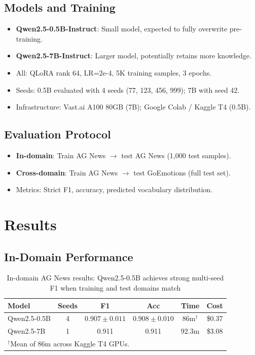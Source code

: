 \documentclass[journal]{IEEEtran}
\begin{document}
\subsection{Models and Training}
\begin{itemize}
\item \textbf{Qwen2.5-0.5B-Instruct}: Small model, expected to fully overwrite pre-training.
\item \textbf{Qwen2.5-7B-Instruct}: Larger model, potentially retains more knowledge.
\item All: QLoRA rank 64, LR=2e-4, 5K training samples, 3 epochs.
\item Seeds: 0.5B evaluated with 4 seeds (77, 123, 456, 999); 7B with seed 42.
\item Infrastructure: Vast.ai A100 80GB (7B); Google Colab / Kaggle T4 (0.5B).
\end{itemize}

\subsection{Evaluation Protocol}
\begin{itemize}
\item \textbf{In-domain}: Train AG News $\to$ test AG News (1,000 test samples).
\item \textbf{Cross-domain}: Train AG News $\to$ test GoEmotions (full test set).
\item Metrics: Strict F1, accuracy, predicted vocabulary distribution.
\end{itemize}

\section{Results}

\subsection{In-Domain Performance}

\begin{table}[!ht]
\centering
\caption{In-domain AG News results: Qwen2.5-0.5B achieves strong multi-seed F1 when training and test domains match}
\label{tab:indomain}
\begin{tabular}{lccccc}
\toprule
\textbf{Model} & \textbf{Seeds} & \textbf{F1} & \textbf{Acc} & \textbf{Time} & \textbf{Cost} \\
\midrule
Qwen2.5-0.5B & 4 & $0.907{\pm}0.011$ & $0.908{\pm}0.010$ & 86m$^\dagger$ & \$0.37 \\
Qwen2.5-7B & 1 & 0.911 & 0.911 & 92.3m & \$3.08 \\
\bottomrule
\multicolumn{6}{l}{\scriptsize $^\dagger$Mean of 86m across Kaggle T4 GPUs.}
\end{tabular}
\end{table}
\end{document}
